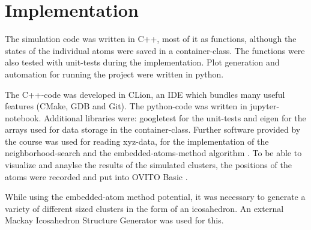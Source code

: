 \chapter{Implementation}
\begin{comment}	
	go about structure of the code 
	-> describe Code structure
		
	-> c++ was used to implement the code (mostly functional)
	-> key atoms container Class which holdes all the Values
	-> most functions were tested with googleTest
\end{comment}

\begin{comment}
code written in c++ most of it pretty functional, classes just used 
for the atoms container which holds the arrays 
while writing it also wrote the unittests with googletest
data aquiered form the code plotted with python
also where large simulations had to be run, called the program from the python code

\end{comment}
The simulation code was written in C++, most of it as functions, although the states of the individual atoms were saved in a container-class.
The functions were also tested with unit-tests during the implementation. 
Plot generation and automation for running the project were written in python.

\begin{comment}
developed in CLion which as an integrated git inviroment
Clion builds with Cmake then clang as a compiler
debugger is gdb(nicely hidden)
- additianal bibs where :
	googletest	for unittests
	eigen		for arrays 
- software used form the class itself 
- ovito for visualization
\end{comment}
The C++-code was developed in CLion, an IDE which bundles many useful features (CMake, GDB and Git)\cite{clion}.
The python-code was written in jupyter-notebook. 
Additional libraries were: googletest \cite{googletest} for the unit-tests and eigen \cite{eigen} for the arrays used for data storage in the container-class. 
Further software provided by the course was used for reading xyz-data, for the implementation of the neighborhood-search and the embedded-atoms-method algorithm \cite{molDymCourse}. 
To be able to visualize and anaylse the results of the simulated clusters, the positions of the atoms were recorded and put into OVITO Basic \cite{ovito}.  

While using the embedded-atom method potential, it was necessary to generate a variety of different sized clusters in the form of an icosahedron. An external Mackay Icosahedron Structure Generator \cite{icosader} was used for this.
\begin{comment}
--
code is structured into the milestones, so an individual milestone can be rerun in case of fuckup
parted into h and cpp files as usual
followed the structure of the milestone
\end{comment}

